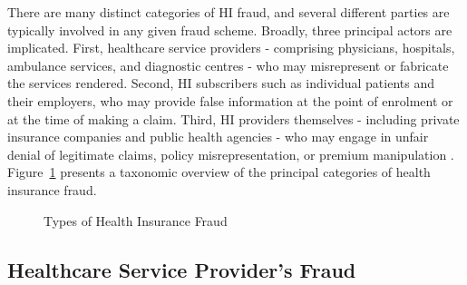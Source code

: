 There are many distinct categories of HI fraud, and several different parties are typically involved in any given fraud scheme. Broadly, three principal actors are implicated. First, healthcare service providers - comprising physicians, hospitals, ambulance services, and diagnostic centres - who may misrepresent or fabricate the services rendered. Second, HI subscribers such as individual patients and their employers, who may provide false information at the point of enrolment or at the time of making a claim. Third, HI providers themselves - including private insurance companies and public health agencies - who may engage in unfair denial of legitimate claims, policy misrepresentation, or premium manipulation \cite{duman2017}. Figure~\ref{fig:fraud_types} presents a taxonomic overview of the principal categories of health insurance fraud.

\begin{figure}[H]
\centering
\caption{Types of Health Insurance Fraud}
\label{fig:fraud_types}
\end{figure}

\subsection{Healthcare Service Provider's Fraud}

